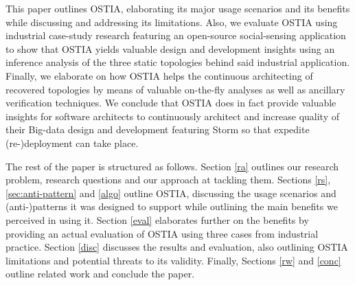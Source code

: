 This paper outlines OSTIA, elaborating its major usage scenarios and its benefits while discussing and addressing its limitations. Also, we evaluate OSTIA using industrial case-study research featuring an open-source social-sensing application to show that OSTIA yields valuable design and development insights using an inference analysis of the three static topologies behind said industrial application. Finally, we elaborate on how OSTIA helps the continuous architecting of recovered topologies by means of valuable on-the-fly analyses as well as ancillary verification techniques. We conclude that OSTIA does in fact provide valuable insights for software architects to continuously architect and increase quality of their Big-data design and development featuring Storm so that expedite (re-)deployment can take place.

The rest of the paper is structured as follows. Section \ref{ra} outlines our research problem, research questions and our approach at tackling them. Sections \ref{rs}, \ref{sec:anti-pattern} and \ref{algo} outline OSTIA, discussing the usage scenarios and (anti-)patterns it was designed to support while outlining the main benefits we perceived in using it. Section \ref{eval} elaborates further on the benefits by providing an actual evaluation of OSTIA using three cases from industrial practice. Section \ref{disc} discusses the results and evaluation, also outlining OSTIA limitations and potential threats to its validity. Finally, Sections \ref{rw} and \ref{conc} outline related work and conclude the paper.